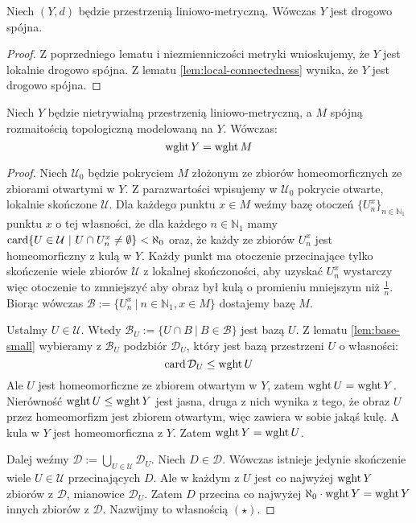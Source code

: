 \begin{lem} \label{lem:connectedness}
  Niech $(Y, d)$ będzie przestrzenią liniowo-metryczną. Wówczas $Y$ jest drogowo spójna.
  \begin{proof}
    Z poprzedniego lematu i niezmienniczości metryki wnioskujemy, że $Y$ jest lokalnie drogowo spójna. Z lematu \ref{lem:local-connectedness} wynika, że $Y$ jest drogowo spójna.
  \end{proof}
\end{lem}

\begin{lem}
  Niech $Y$ będzie nietrywialną przestrzenią liniowo-metryczną, a $M$ spójną rozmaitością topologiczną modelowaną na $Y$. Wówczas:
  \[
    \operatorname{wght} Y = \operatorname{wght} M
  \]
  \begin{proof}
    Niech $\mathcal U_0$ będzie pokryciem $M$ złożonym ze zbiorów homeomorficznych ze zbiorami otwartymi w $Y$. Z parazwartości wpisujemy w $\mathcal U_0$ pokrycie otwarte, lokalnie skończone $\mathcal U$. Dla każdego punktu $x \in M$ weźmy bazę otoczeń $\{U_n^x\}_{n \in \mathbb{N}_1}$ punktu $x$ o tej własności, że dla każdego $n \in \mathbb{N}_1$ mamy $\operatorname{card}\{U \in \mathcal U\ |\ U \cap U_n^x \neq \emptyset\} < \aleph_0$ oraz, że każdy ze zbiorów $U_n^x$ jest homeomorficzny z kulą w $Y$. Każdy punkt ma otoczenie przecinające tylko skończenie wiele zbiorów $\mathcal U$ z lokalnej skończoności, aby uzyskać $U_n^x$ wystarczy więc otoczenie to zmniejszyć aby obraz był kulą o promieniu mniejszym niż $\frac{1}{n}$. Biorąc wówczas $\mathcal B := \{U_n^x\ |\ n \in \mathbb{N}_1, x \in M\}$ dostajemy bazę $M$.
    
    Ustalmy $U \in \mathcal U$. Wtedy $\mathcal B_U := \{U \cap B\ |\ B \in \mathcal B\}$ jest bazą $U$. Z lematu \ref{lem:base-small} wybieramy z $\mathcal B_U$ podzbiór $\mathcal D_U$, który jest bazą przestrzeni $U$ o własności:
    \[
      \operatorname{card} \mathcal D_U \leq \operatorname{wght} U
    \]
    Ale $U$ jest homeomorficzne ze zbiorem otwartym w $Y$, zatem $\operatorname{wght} U = \operatorname{wght} Y$. Nierówność $\operatorname{wght} U \leq \operatorname{wght} Y$ jest jasna, druga z nich wynika z tego, że obraz $U$ przez homeomorfizm jest zbiorem otwartym, więc zawiera w sobie jakąś kulę. A kula w $Y$ jest homeomorficzna z $Y$. Zatem $\operatorname{wght} Y = \operatorname{wght} U$.
    
    Dalej weźmy $\mathcal D := \bigcup_{U \in \mathcal U} \mathcal D_U$.
    Niech $D \in \mathcal D$. Wówczas istnieje jedynie skończenie wiele $U \in \mathcal U$ przecinających $D$. Ale w każdym z $U$ jest co najwyżej $\operatorname{wght} Y$ zbiorów z $\mathcal D$, mianowice $\mathcal D_U$. Zatem $D$ przecina co najwyżej $\aleph_0 \cdot \operatorname{wght} Y = \operatorname{wght} Y$ innych zbiorów z $\mathcal D$. Nazwijmy to własnością $(\star)$.
    

\end{proof}
\end{lem}
